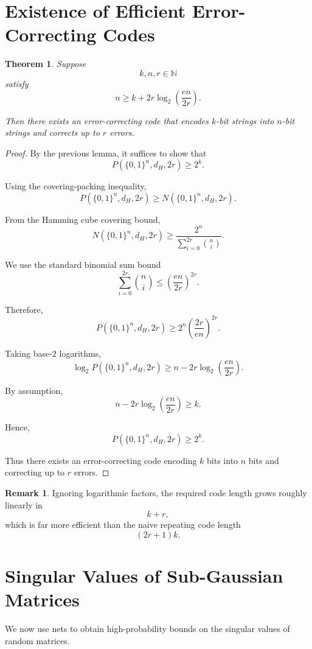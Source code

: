 \documentclass[12pt,oneside]{book}
\numberwithin{equation}{section}
\theoremstyle{definition}
\newtheorem{remark}{Remark}[section]
\theoremstyle{plain}
\newtheorem{theorem}{Theorem}[section]
\theoremstyle{remark}
\newcommand{\N}{\mathbb{N}}
\begin{document}
\section{Existence of Efficient Error-Correcting Codes}

\begin{theorem}
Suppose
\[
k,n,r\in\N
\]
satisfy
\[
n
\geq
k+2r\log_2\left(\frac{en}{2r}\right).
\]

Then there exists an error-correcting code that encodes $k$-bit strings into $n$-bit strings and corrects up to $r$ errors.
\end{theorem}

\begin{proof}
By the previous lemma, it suffices to show that
\[
P(\{0,1\}^n,d_H,2r)\geq 2^k.
\]

Using the covering-packing inequality,
\[
P(\{0,1\}^n,d_H,2r)
\geq
N(\{0,1\}^n,d_H,2r).
\]

From the Hamming cube covering bound,
\[
N(\{0,1\}^n,d_H,2r)
\geq
\frac{2^n}
{\sum_{i=0}^{2r}\binom{n}{i}}.
\]

We use the standard binomial sum bound
\[
\sum_{i=0}^{2r}\binom{n}{i}
\leq
\left(\frac{en}{2r}\right)^{2r}.
\]

Therefore,
\[
P(\{0,1\}^n,d_H,2r)
\geq
2^n
\left(\frac{2r}{en}\right)^{2r}.
\]

Taking base-$2$ logarithms,
\[
\log_2 P(\{0,1\}^n,d_H,2r)
\geq
n-2r\log_2\left(\frac{en}{2r}\right).
\]

By assumption,
\[
n-2r\log_2\left(\frac{en}{2r}\right)
\geq
k.
\]

Hence,
\[
P(\{0,1\}^n,d_H,2r)
\geq
2^k.
\]

Thus there exists an error-correcting code encoding $k$ bits into $n$ bits and correcting up to $r$ errors.
\end{proof}

\begin{remark}
Ignoring logarithmic factors, the required code length grows roughly linearly in
\[
k+r,
\]
which is far more efficient than the naive repeating code length
\[
(2r+1)k.
\]
\end{remark}

\section{Singular Values of Sub-Gaussian Matrices}

We now use nets to obtain high-probability bounds on the singular values of random matrices.
\end{document}
